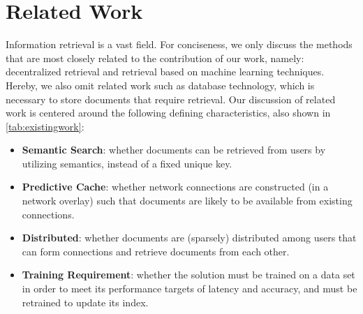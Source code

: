 \documentclass[10pt,journal]{IEEEtran}
\newcommand{\todo}[1]{\textcolor{red}{\textbf{[TODO: #1]}}}
\begin{document}

\section{Related Work}
\label{sec:relatedwork}

Information retrieval is a vast field. For conciseness, we only discuss the methods that are most closely related to the contribution of our work, namely: decentralized retrieval and retrieval based on machine learning techniques.
Hereby, we also omit related work such as database technology, which is necessary to store documents that require retrieval.
Our discussion of related work is centered around the following defining characteristics, also shown in \autoref{tab:existingwork}:

\begin{itemize}
   \item \textbf{Semantic Search}: whether documents can be retrieved from users by utilizing semantics, instead of a fixed unique key.
   \item \textbf{Predictive Cache}: whether network connections are constructed (in a network overlay) such that documents are likely to be available from existing connections.
   \item \textbf{Distributed}: whether documents are (sparsely) distributed among users that can form connections and retrieve documents from each other.
   \item \textbf{Training Requirement}: whether the solution must be trained on a data set in order to meet its performance targets of latency and accuracy, and must be retrained to update its index.
\end{itemize}

\end{document}
